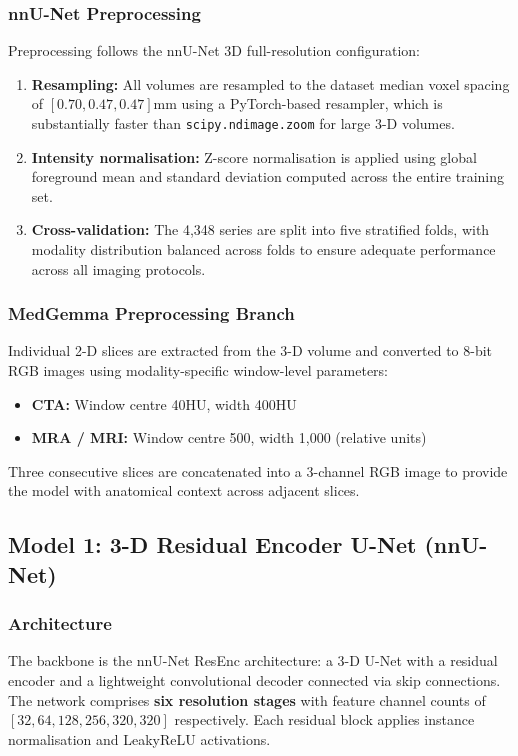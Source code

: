 \documentclass[journal]{IEEEtran}
\begin{document}
\subsubsection{nnU-Net Preprocessing}
Preprocessing follows the nnU-Net 3D full-resolution configuration:
\begin{enumerate}
  \item \textbf{Resampling:} All volumes are resampled to the dataset
        median voxel spacing of $[0.70, 0.47, 0.47]$\;mm using a
        PyTorch-based resampler, which is substantially faster than
        \texttt{scipy.ndimage.zoom} for large 3-D volumes.
  \item \textbf{Intensity normalisation:} Z-score normalisation is applied
        using global foreground mean and standard deviation computed across
        the entire training set.
  \item \textbf{Cross-validation:} The 4,348 series are split into five
        stratified folds, with modality distribution balanced across folds
        to ensure adequate performance across all imaging protocols.
\end{enumerate}

\subsubsection{MedGemma Preprocessing Branch}
Individual 2-D slices are extracted from the 3-D volume and converted to
8-bit RGB images using modality-specific window-level parameters:
\begin{itemize}
  \item \textbf{CTA:} Window centre 40\;HU, width 400\;HU
  \item \textbf{MRA / MRI:} Window centre 500, width 1,000 (relative units)
\end{itemize}
Three consecutive slices are concatenated into a 3-channel RGB image to
provide the model with anatomical context across adjacent slices.

\subsection{Model 1: 3-D Residual Encoder U-Net (nnU-Net)}

\subsubsection{Architecture}
The backbone is the nnU-Net ResEnc architecture: a 3-D U-Net with a
residual encoder and a lightweight convolutional decoder connected via
skip connections. The network comprises \textbf{six resolution stages}
with feature channel counts of $[32, 64, 128, 256, 320, 320]$ respectively.
Each residual block applies instance normalisation and LeakyReLU activations.
\end{document}
